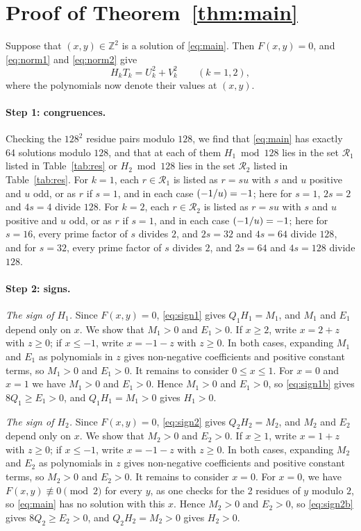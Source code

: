 \documentclass[11pt]{article}
\newcommand{\Z}{\mathbb{Z}}
\newcommand{\leg}[2]{\mathchoice{\biggl(\dfrac{#1}{#2}\biggr)}{(#1/#2)}{(#1/#2)}{(#1/#2)}}
\begin{document}
\section{Proof of Theorem~\ref{thm:main}}

Suppose that $(x,y)\in\Z^2$ is a solution of \eqref{eq:main}. Then $F(x,y)=0$, and \eqref{eq:norm1} and \eqref{eq:norm2} give
\begin{equation}\label{eq:HT}
H_kT_k=U_k^2+V_k^2\qquad(k=1,2),
\end{equation}
where the polynomials now denote their values at $(x,y)$.

\paragraph{Step 1: congruences.} Checking the $128^2$ residue pairs modulo $128$, we find that \eqref{eq:main} has exactly 64 solutions modulo $128$, and that at each of them $H_{1}\bmod 128$ lies in the set $\mathcal R_{1}$ listed in Table~\ref{tab:res} or $H_{2}\bmod 128$ lies in the set $\mathcal R_{2}$ listed in Table~\ref{tab:res}. For $k=1$, each $r\in\mathcal R_{1}$ is listed as $r=su$ with $s$ and $u$ positive and $u$ odd, or as $r$ if $s=1$, and in each case $\leg{-1}{u}=-1$; here for $s=1$, $2s=2$ and $4s=4$ divide $128$. For $k=2$, each $r\in\mathcal R_{2}$ is listed as $r=su$ with $s$ and $u$ positive and $u$ odd, or as $r$ if $s=1$, and in each case $\leg{-1}{u}=-1$; here for $s=16$, every prime factor of $s$ divides $2$, and $2s=32$ and $4s=64$ divide $128$, and for $s=32$, every prime factor of $s$ divides $2$, and $2s=64$ and $4s=128$ divide $128$.

\paragraph{Step 2: signs.} \emph{The sign of $H_{1}$.} Since $F(x,y)=0$, \eqref{eq:sign1} gives $Q_{1}H_{1}=M_{1}$, and $M_{1}$ and $E_{1}$ depend only on $x$. We show that $M_{1}>0$ and $E_{1}>0$. If $x\geq2$, write $x=2+z$ with $z\geq0$; if $x\leq-1$, write $x=-1-z$ with $z\geq0$. In both cases, expanding $M_{1}$ and $E_{1}$ as polynomials in $z$ gives non-negative coefficients and positive constant terms, so $M_{1}>0$ and $E_{1}>0$. It remains to consider $0\leq x\leq1$. For $x=0$ and $x=1$ we have $M_{1}>0$ and $E_{1}>0$. Hence $M_{1}>0$ and $E_{1}>0$, so \eqref{eq:sign1b} gives $8Q_{1}\geq E_{1}>0$, and $Q_{1}H_{1}=M_{1}>0$ gives $H_{1}>0$.

\emph{The sign of $H_{2}$.} Since $F(x,y)=0$, \eqref{eq:sign2} gives $Q_{2}H_{2}=M_{2}$, and $M_{2}$ and $E_{2}$ depend only on $x$. We show that $M_{2}>0$ and $E_{2}>0$. If $x\geq1$, write $x=1+z$ with $z\geq0$; if $x\leq-1$, write $x=-1-z$ with $z\geq0$. In both cases, expanding $M_{2}$ and $E_{2}$ as polynomials in $z$ gives non-negative coefficients and positive constant terms, so $M_{2}>0$ and $E_{2}>0$. It remains to consider $x=0$. For $x=0$, we have $F(x,y)\not\equiv0\pmod{2}$ for every $y$, as one checks for the 2 residues of $y$ modulo $2$, so \eqref{eq:main} has no solution with this $x$. Hence $M_{2}>0$ and $E_{2}>0$, so \eqref{eq:sign2b} gives $8Q_{2}\geq E_{2}>0$, and $Q_{2}H_{2}=M_{2}>0$ gives $H_{2}>0$.
\end{document}
